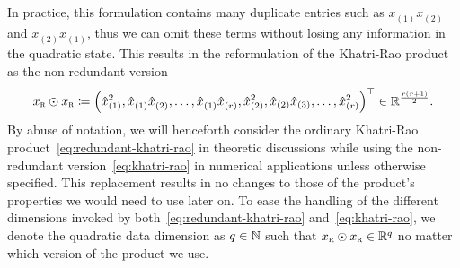 In practice, this formulation contains many duplicate entries such as $x_{(1)}^{\phantom{1}} x_{(2)}^{\phantom{1}}$ and $x_{(2)}^{\phantom{1}} x_{(1)}^{\phantom{1}}$, thus we can omit these terms without losing any information in the quadratic state.
This results in the reformulation of the Khatri-Rao product as the non-redundant version
\begin{equation}\label{eq:khatri-rao}
    x_{\textnormal{\scshape r}} \odot x_{\textnormal{\scshape r}} \coloneqq {\left( \hat{x}_{(1)}^2, \hat{x}_{(1)}^{\phantom{1}} \hat{x}_{(2)}^{\phantom{1}}, \dots, \hat{x}_{(1)}^{\phantom{1}} \hat{x}_{(r)}^{\phantom{1}}, \hat{x}_{(2)}^2, \hat{x}_{(2)} \hat{x}_{(3)}, \dots, \hat{x}_{(r)}^2 \right)}^{\top} \in \mathbb{R}^{\frac{r (r + 1)}{2}}.
\end{equation}
By abuse of notation, we will henceforth consider the ordinary Khatri-Rao product~\eqref{eq:redundant-khatri-rao} in theoretic discussions while using the non-redundant version~\eqref{eq:khatri-rao} in numerical applications unless otherwise specified.
This replacement results in no changes to those of the product's properties we would need to use later on.
To ease the handling of the different dimensions invoked by both~\eqref{eq:redundant-khatri-rao} and~\eqref{eq:khatri-rao}, we denote the quadratic data dimension as $q \in \mathbb{N}$ such that $x_{\textnormal{\scshape r}} \odot x_{\textnormal{\scshape r}} \in \mathbb{R}^q$ no matter which version of the product we use.

